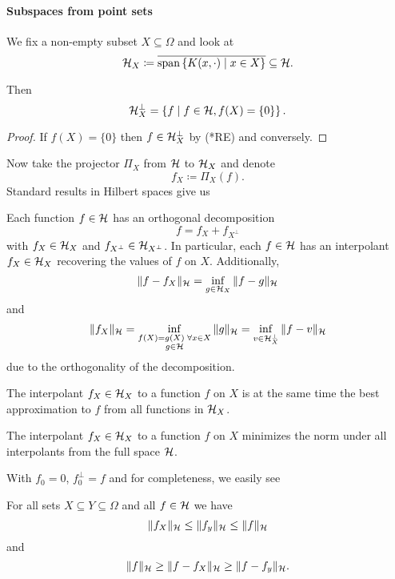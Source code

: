 \documentclass[../skript.tex]{subfiles}
\begin{document}
\paragraph*{Subspaces from point sets}
We fix a non-empty subset $X \subseteq \Omega$ and look at
\[
	\mathcal{H}_X \coloneqq \overline{\operatorname*{span} \left\{ K(x, \cdot) \mid x \in X \right\}} \subseteq \mathcal{H}.
\]
\begin{theorem} %
\label{thm:13}
Then
\[
	\mathcal{H}_X^\perp = \left\{ f \mid f \in \mathcal{H}, f(X) = \{ 0 \} \right\}.
\]
\end{theorem}
\begin{proof}
If $f(X) = \{ 0 \}$ then $f \in \mathcal{H}_X^\perp$ by (*RE) %
and conversely.
\end{proof}
Now take the projector $\Pi_X$ from $\mathcal{H}$ to $\mathcal{H}_X$ and denote
\[
	f_X \coloneqq \Pi_X(f).
\]
Standard results in Hilbert spaces give us
\begin{theorem} %
\label{thm:14}
Each function $f \in \mathcal{H}$ has an orthogonal decomposition
\[
	f = f_X + f_{X^\perp}
\]
with $f_X \in \mathcal{H}_X$ and $f_{X^\perp} \in \mathcal{H}_{X^\perp}$.
In particular, each $f \in \mathcal{H}$ has an interpolant $f_X \in \mathcal{H}_X$ recovering the values of $f$ on $X$.
Additionally,
\[
	\| f - f_X \|_{\mathcal{H}} = \inf_{g \in \mathcal{H}_X} \| f - g \|_{\mathcal{H}}
\]
and 
\[
	\| f_X \|_{\mathcal{H}} = \inf_{\substack{f(X) = g(X) \; \forall x \in X \\ g \in \mathcal{H}}} \| g \|_{\mathcal{H}} = \inf_{v \in \mathcal{H}_X^\perp} \| f - v \|_{\mathcal{H}}
\]
due to the orthogonality of the decomposition.
\end{theorem}
\begin{corollary} %
\label{thm:15}
The interpolant $f_X \in \mathcal{H}_X$ to a function $f$ on $X$ is at the same time the best approximation to $f$ from all functions in $\mathcal{H}_X$.
\end{corollary}
\begin{corollary} %
\label{thm:16}
The interpolant $f_X \in \mathcal{H}_X$ to a function $f$ on $X$ minimizes the norm under all interpolants from the full space $\mathcal{H}$.
\end{corollary}
With $f_0 = 0$, $f_0^\perp = f$ and 
for completeness, we easily see
\begin{corollary} %
\label{thm:17}
For all sets $X \subseteq Y \subseteq \Omega$ and all $f \in \mathcal{H}$ we have
\[
	\| f_X \|_{\mathcal{H}} \leq \| f_y \|_{\mathcal{H}} \leq \| f \|_{\mathcal{H}}
\]
and
\[
	\| f \|_{\mathcal{H}} \geq \| f - f_X \|_{\mathcal{H}} \geq \| f - f_y \|_{\mathcal{H}}.
\]
\end{corollary}
\end{document}
